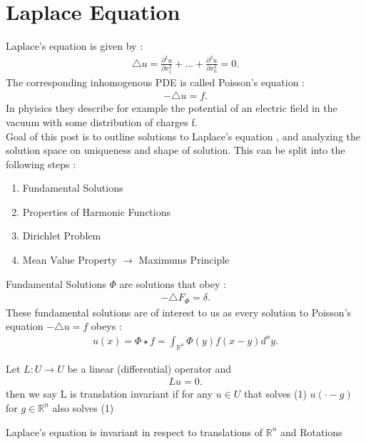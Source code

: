 \chapter{Laplace Equation}
Laplace's equation is given by : 
\begin{align*}
  \triangle u = \frac{\partial ^2 u}{\partial x_1^2}  +  \ldots  + \frac{\partial ^2 u}{\partial x_n^2}  = 0
.\end{align*}
The corresponding inhomogenous PDE is called Poisson's equation : 
\begin{align*}
  - \triangle u = f
.\end{align*}
In phyisics they describe for example the potential of an electric field in the vacuum with some distribution of charges f.\\[1ex]
Goal of this post is to outline solutions to Laplace's equation , and analyzing the solution space on uniqueness and shape of solution.
This can be split into the following steps : 
\begin{enumerate}
  \item Fundamental Solutions
  \item Properties of Harmonic Functions 
  \item Dirichlet Problem
  \item Mean Value Property $\to $ Maximums Principle
\end{enumerate}
Fundamental Solutions  $\Phi $ are solutions that obey : 
\begin{align*}
  -\triangle F_{\Phi } = \delta  
.\end{align*}
These fundamental solutions are of interest to us as every solution to Poisson's equation $-\triangle u = f$ obeys : 
\begin{align*}
  u(x) = \Phi  \star  f = \int_{\mathbb{R}^{n } } \Phi(y) f(x-y) d^{n }y 
.\end{align*}
\begin{definition}
  Let $L : U \to  U$ be a linear (differential) operator and 
  \begin{align*}
    Lu = 0 \tag{1}
  .\end{align*}
  then we say L is translation invariant if for any $u \in  U$ that solves (1) 
  $u(\cdot - g)$ for $g \in  \mathbb{R}^{n} $  also solves (1)
\end{definition}
\begin{lemma}
  Laplace's equation is invariant in respect to translations of $\mathbb{R}^{n} $  and Rotations
\end{lemma}
